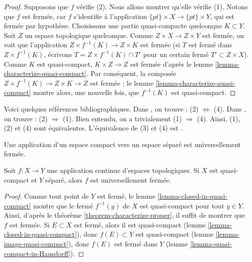 \begin{proof}
\medskip\noindent
Supposons que $f$ vérifie (2). Nous allons montrer qu'elle vérifie (1).
Notons que $f$ est fermée, car $f$ s'identifie à l'application
$\{pt\} \times X \to \{pt\} \times Y$, qui est fermée par hypothèse.
Choisissons une partie quasi-compacte quelconque $K \subset Y$.
Soit $Z$ un espace topologique quelconque.
Comme $Z \times X \to Z \times Y$ est fermée, on voit que l'application
$Z \times f^{-1}(K) \to Z \times K$ est fermée (si $T$ est fermé dans
$Z \times f^{-1}(K)$, écrivons
$T = Z \times f^{-1}(K) \cap T'$ pour un certain fermé
$T' \subset Z \times X$). Comme $K$ est quasi-compact,
$K \times Z\to Z$ est fermée d'après le
lemme \ref{lemma-characterize-quasi-compact}.
Par conséquent, la composée $Z \times f^{-1}(K)\to Z \times K \to Z$ est
fermée ; le lemme \ref{lemma-characterize-quasi-compact} montre alors, une
nouvelle fois, que $f^{-1}(K)$ est quasi-compact.
\end{proof}

\begin{remark}
\label{remark-proof-literature}
Voici quelques références bibliographiques.
Dans \cite[I, p. 75, théorème 1]{Bourbaki}, on trouve :
(2) $\Leftrightarrow$ (4).
Dans \cite[I, p. 77, Proposition 6]{Bourbaki}, on trouve :
(2) $\Rightarrow$ (1).
Bien entendu, on a trivialement (1) $\Rightarrow$ (4).
Ainsi, (1), (2) et (4) sont équivalentes.
L'équivalence de (3) et (4) est \cite[chapitre II, exercice 25]{LangReal}.
\end{remark}

\begin{lemma}
\label{lemma-closed-map}
\begin{slogan}
Une application d'un espace compact vers un espace séparé est
universellement fermée.
\end{slogan}
Soit $f : X \to Y$ une application continue d'espaces topologiques.
Si $X$ est quasi-compact et $Y$ séparé, alors $f$ est universellement fermée.
\end{lemma}

\begin{proof}
Comme tout point de $Y$ est fermé, le
lemme \ref{lemma-closed-in-quasi-compact} montre que le fermé $f^{-1}(y)$ de
$X$ est quasi-compact pour tout $y \in Y$.
Ainsi, d'après le théorème \ref{theorem-characterize-proper}, il suffit de
montrer que $f$ est fermée.
Si $E \subset X$ est fermé, alors il est quasi-compact
(lemme \ref{lemma-closed-in-quasi-compact}), donc $f(E) \subset Y$ est
quasi-compact (lemme \ref{lemma-image-quasi-compact}), donc $f(E)$ est fermé
dans $Y$ (lemme \ref{lemma-quasi-compact-in-Hausdorff}).
\end{proof}

